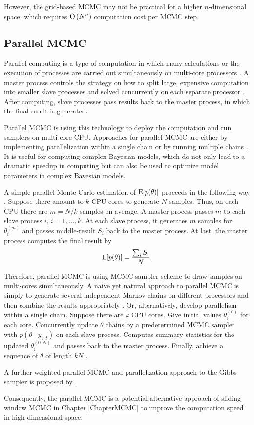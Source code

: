 However, the grid-based MCMC may not be practical for a higher $n$-dimensional space, which requires ${\rm O}\left(N^n\right)$ computation cost per MCMC step. 


\subsection*{Parallel MCMC}

Parallel computing is a type of computation in which many calculations or the execution of processes are carried out simultaneously on multi-core processors \citep{asanovic2006landscape}. A master process controls the strategy on how to split large, expensive computation into smaller slave processes and solved concurrently on each separate processor \citep{Almasi1994Highly}. After computing, slave processes pass results back to the master process, in which the final result is generated. 

Parallel MCMC is using this technology to deploy the computation and run samplers on multi-core CPU. Approaches for parallel MCMC are either by implementing parallelization within a single chain or by running multiple chains \citep{wu2012parallel}. It is useful for computing complex Bayesian models, which do not only lead to a dramatic speedup in computing but can also be used to optimize model parameters in complex Bayesian models.

A simple parallel Monte Carlo estimation of $\mathrm{E}\lbrack p(\theta)\rbrack$ proceeds in the following way \citep{kontoghiorghes2005handbook}. Suppose there amount to $k$ CPU cores to generate $N$ samples. Thus, on each CPU there are $m=N/k$ samples on average. A master process passes $m$ to each slave process $i$, $i=1,\ldots,k$. At each slave process, it generates $m$ samples for $\theta_i^{(m)}$ and passes middle-result $S_i$ back to the master process. At last, the master process computes the final result by 
\begin{equation*}
\mathrm{E}\lbrack p(\theta)\rbrack=\frac{\sum_i S_i}{N}. 
\end{equation*}

Therefore, parallel MCMC is using MCMC sampler scheme to draw samples on multi-cores simultaneously. A naive yet natural approach to parallel MCMC is simply to generate several independent Markov chains on different
processors and then combine the results appropriately \citep{bradford1996markov, gelman1992inference}. Or, alternatively, develop parallelism within a single chain. Suppose there are $k$ CPU cores. Give initial values $\theta_i^{(0)}$ for each core. Concurrently update $\theta$ chains by a predetermined MCMC sampler with $p(\theta\mid y_{1:t})$ on each slave process. Computes summary statistics for the updated $\theta_i^{(0: N)}$ and passes back to the master process. Finally, achieve a sequence of $\theta$ of length $kN$ \citep{wu2012parallel}. 

A further weighted parallel MCMC and parallelization approach to the Gibbs sampler is proposed by \cite{vanderwerken2013parallel}.

Consequently, the parallel MCMC is a potential alternative approach of sliding window MCMC in Chapter \ref{ChapterMCMC} to improve the computation speed in high dimensional space. 


